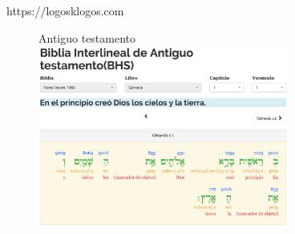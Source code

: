 \documentclass[11pt]{beamer}
\begin{document}
\begin{frame}{https://logosklogos.com}
  \begin{figure}{Antiguo testamento}
    \includegraphics[width=3.25in]{images/logos-hebreo.png}
  \end{figure}
\end{frame}
\end{document}
